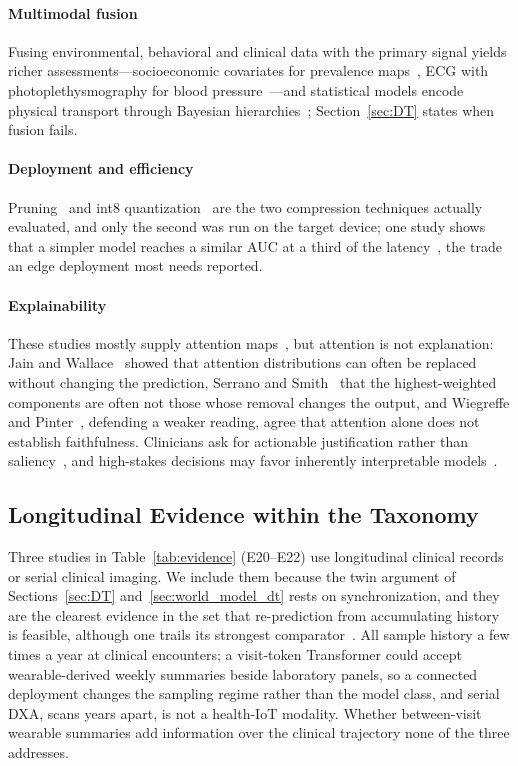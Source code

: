 \documentclass[journal]{IEEEtran}
\begin{document}
\paragraph{Multimodal fusion} Fusing environmental, behavioral and clinical data with the primary signal yields richer assessments---socioeconomic covariates for prevalence maps~\cite{XiaoLi2016DiabetesSpatiotemporal}, ECG with photoplethysmography for blood pressure~\cite{liu2024cignn}---and statistical models encode physical transport through Bayesian hierarchies~\cite{liu2022convectionDiffusion}; Section~\ref{sec:DT} states when fusion fails.

\paragraph{Deployment and efficiency} Pruning~\cite{5} and int8 quantization~\cite{verbiest2023gaitstride} are the two compression techniques actually evaluated, and only the second was run on the target device; one study shows that a simpler model reaches a similar AUC at a third of the latency~\cite{li2026edgeischemia}, the trade an edge deployment most needs reported.

\paragraph{Explainability} These studies mostly supply attention maps~\cite{2,4}, but attention is not explanation: Jain and Wallace~\cite{jain2019attention} showed that attention distributions can often be replaced without changing the prediction, Serrano and Smith~\cite{serrano2019attention} that the highest-weighted components are often not those whose removal changes the output, and Wiegreffe and Pinter~\cite{wiegreffe2019attention}, defending a weaker reading, agree that attention alone does not establish faithfulness. Clinicians ask for actionable justification rather than saliency~\cite{tonekaboni2019clinicians}, and high-stakes decisions may favor inherently interpretable models~\cite{rudin2019stopexplaining}.

\subsection{Longitudinal Evidence within the Taxonomy}
\label{sec:longitudinal}
Three studies in Table~\ref{tab:evidence} (E20--E22) use longitudinal clinical records or serial clinical imaging. We include them because the twin argument of Sections~\ref{sec:DT} and~\ref{sec:world_model_dt} rests on synchronization, and they are the clearest evidence in the set that re-prediction from accumulating history is feasible, although one trails its strongest comparator~\cite{lin2022deep}. All sample history a few times a year at clinical encounters; a visit-token Transformer could accept wearable-derived weekly summaries beside laboratory panels, so a connected deployment changes the sampling regime rather than the model class, and serial DXA, scans years apart, is not a health-IoT modality. Whether between-visit wearable summaries add information over the clinical trajectory none of the three addresses.
\end{document}
